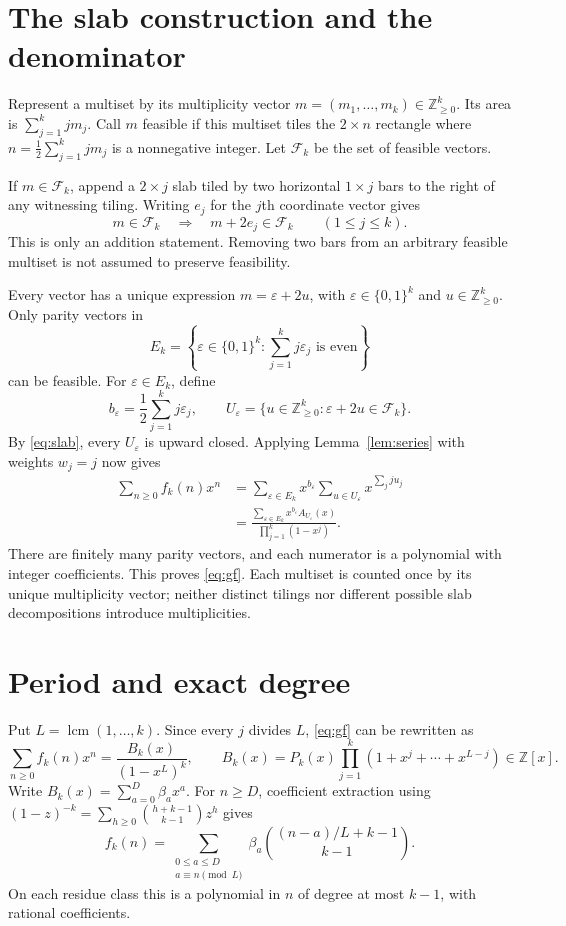 \documentclass[11pt]{article}
\newcommand{\NN}{\mathbb Z_{\geq0}}
\begin{document}
\section{The slab construction and the denominator}
Represent a multiset by its multiplicity vector
$m=(m_1,\ldots,m_k)\in\NN^k$. Its area is
$\sum_{j=1}^k jm_j$. Call $m$ feasible if this multiset tiles the
$2\times n$ rectangle where
$n=\tfrac12\sum_{j=1}^k jm_j$ is a nonnegative integer.
Let $\mathcal F_k$ be the set of feasible vectors.

If $m\in\mathcal F_k$, append a $2\times j$ slab tiled by two
horizontal $1\times j$ bars to the right of any witnessing tiling.
Writing $e_j$ for the $j$th coordinate vector gives
\begin{equation}\label{eq:slab}
 m\in\mathcal F_k\quad\Longrightarrow\quad
 m+2e_j\in\mathcal F_k\qquad(1\leq j\leq k).
\end{equation}
This is only an addition statement. Removing two bars from an arbitrary
feasible multiset is not assumed to preserve feasibility.

Every vector has a unique expression $m=\varepsilon+2u$, with
$\varepsilon\in\{0,1\}^k$ and $u\in\NN^k$. Only parity vectors in
\[
 E_k=\left\{\varepsilon\in\{0,1\}^k:
                  \sum_{j=1}^k j\varepsilon_j\text{ is even}\right\}
\]
can be feasible. For $\varepsilon\in E_k$, define
\[
 b_\varepsilon=\frac12\sum_{j=1}^k j\varepsilon_j,
 \qquad
 U_\varepsilon=\{u\in\NN^k:\varepsilon+2u\in\mathcal F_k\}.
\]
By \eqref{eq:slab}, every $U_\varepsilon$ is upward closed.
Applying Lemma~\ref{lem:series} with weights $w_j=j$ now gives
\begin{align*}
 \sum_{n\geq0}f_k(n)x^n
 &=\sum_{\varepsilon\in E_k}x^{b_\varepsilon}
                 \sum_{u\in U_\varepsilon}x^{\sum_jju_j}\\
 &=\frac{\displaystyle\sum_{\varepsilon\in E_k}
                 x^{b_\varepsilon}A_{U_\varepsilon}(x)}
              {\prod_{j=1}^k(1-x^j)}.
\end{align*}
There are finitely many parity vectors, and each numerator is a
polynomial with integer coefficients. This proves \eqref{eq:gf}.
Each multiset is counted once by its unique multiplicity vector;
neither distinct tilings nor different possible slab decompositions
introduce multiplicities.

\section{Period and exact degree}
Put $L=\operatorname{lcm}(1,\ldots,k)$. Since every $j$ divides $L$,
\eqref{eq:gf} can be rewritten as
\[
 \sum_{n\geq0} f_k(n)x^n
 =\frac{B_k(x)}{(1-x^L)^k},\qquad
 B_k(x)=P_k(x)\prod_{j=1}^k
                (1+x^j+\cdots+x^{L-j})\in\mathbb Z[x].
\]
Write $B_k(x)=\sum_{a=0}^{D}\beta_ax^a$. For $n\geq D$, coefficient
extraction using $(1-z)^{-k}=\sum_{h\geq0}\binom{h+k-1}{k-1}z^h$
gives
\begin{equation}\label{eq:quasi}
 f_k(n)=\sum_{\substack{0\leq a\leq D\\a\equiv n\pmod L}}
       \beta_a\binom{(n-a)/L+k-1}{k-1}.
\end{equation}
On each residue class this is a polynomial in $n$ of degree at most
$k-1$, with rational coefficients.
\end{document}
